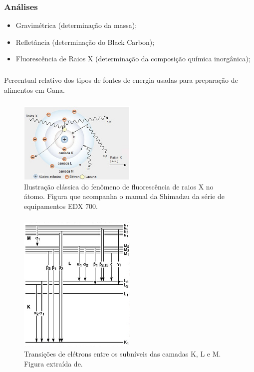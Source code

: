 \begin{frame}
  \frametitle{Análises}
  \begin{itemize}
    \item Gravimétrica (determinação da massa);  
    \item Refletância (determinação do Black Carbon);
    \item Fluorescência de Raios X (determinação da composição química inorgânica);
  \end{itemize}
\end{frame}

\begin{frame}
  \frametitle{}
  \begin{table}[H]
  	\centering
  	
  	\caption{Percentual relativo dos tipos de fontes de energia usadas para preparação 
  		    de alimentos em Gana. 
  		\label{table:cookfuel}}
  \end{table}
\end{frame}

\begin{frame}
  \frametitle{}
  \begin{figure}[H]
    \centering
    \includegraphics[width=0.5\textwidth]{../../inputs/images/shimadzu_atomo.jpg}
    \caption{Ilustração clássica do fenômeno de fluorescência de raios X no átomo. 
             Figura que acompanha o manual da Shimadzu da série de equipamentos
             EDX 700. \label{fig:shimadzu_atomo}}
  \end{figure}
\end{frame}

\begin{frame}
  \frametitle{}
  \begin{figure}[H]
    \centering 
    \includegraphics[width=0.5\textwidth]{../../inputs/images/Siegbahn.jpg}
    \caption{Transições de elétrons entre os subníveis das camadas K, L e M. 
             Figura extraída de. \label{fig:siegbahn}}
  \end{figure}
\end{frame}

